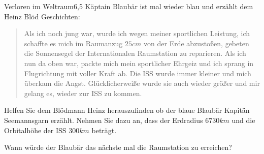 \begin{problem}{Verloren im Weltraum}{6,5}
Käptain Blaubär ist mal wieder blau und erzählt dem Heinz Blöd Geschichten:
\begin{quote}
 Als ich noch jung war, wurde ich wegen meiner sportlichen Leistung, ich schaffte es mich im Raumanzug $25\unit{cm}$ von der Erde abzustoßen, gebeten die Sonnensegel der Internationalen Raumstation zu reparieren. Als ich nun da oben war, packte mich mein sportlicher Ehrgeiz und ich sprang in Flugrichtung mit voller Kraft ab. Die ISS wurde immer kleiner und mich überkam die Angst. Glücklicherweiße wurde sie auch wieder größer und mir gelang es, wieder zur ISS zu kommen.
\end{quote}
\begin{abcenum}
 \item Helfen Sie dem Blödmann Heinz herauszufinden ob der blaue Blaubär Kapitän Seemannsgarn erzählt. Nehmen Sie dazu an, dass der Erdradius $6730\unit{km}$ und die Orbitalhöhe der ISS $300\unit{km}$ beträgt.
 \item Wann würde der Blaubär das nächste mal die Raumstation zu erreichen?
\end{abcenum}
\end{problem}


